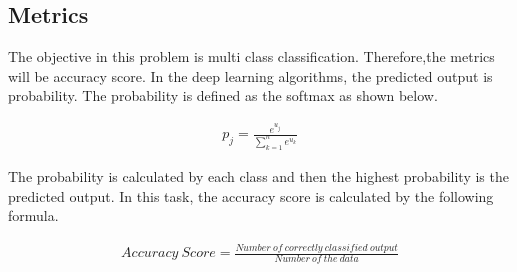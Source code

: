 \subsection{Metrics}


The objective in this problem is multi class classification. Therefore,the metrics will be accuracy score. 
In the deep learning algorithms, the predicted output is probability. The probability is defined as the softmax as shown below.

\begin{eqnarray}
p_{j}=\frac{e^{u_{j}}}{\sum_{k=1}^{n}e^{u_{k}}}
\end{eqnarray}

The probability is calculated by each class and then the highest probability is the predicted output. In this task, the accuracy score is calculated by the following formula.

 \begin{eqnarray}
Accuracy  \ Score =\frac{Number \ of\  correctly\  classified\ output}{Number\ of\ the\ data}
\end{eqnarray}




